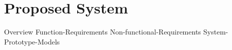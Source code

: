 \section{Proposed System}
{Overview}
{Function-Requirements}
{Non-functional-Requirements}
{System-Prototype-Models}
